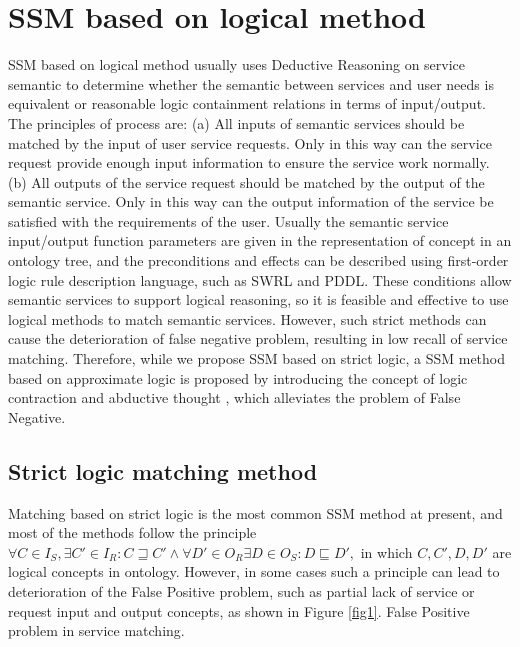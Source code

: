 \documentclass{ieeeaccess}
\begin{document}
\section{SSM based on logical method}
SSM based on logical method usually uses Deductive Reasoning on service semantic to determine whether the semantic between services and user needs is equivalent or reasonable logic containment relations in terms of input/output. The principles of process are: (a) All inputs of semantic services should be matched by the input of user service requests. Only in this way can the service request provide enough input information to ensure the service work normally. (b) All outputs of the service request should be matched by the output of the semantic service. Only in this way can the output information of the service be satisfied with the requirements of the user. Usually the semantic service input/output function parameters are given in the representation of concept in an ontology tree, and the preconditions and effects can be described using first-order logic rule description language, such as SWRL and PDDL. These conditions allow semantic services to support logical reasoning, so it is feasible and effective to use logical methods to match semantic services. However, such strict methods can cause the deterioration of false negative problem, resulting in low recall of service matching. Therefore, while we propose SSM based on strict logic, a SSM method based on approximate logic is proposed by introducing the concept of logic contraction and abductive thought \cite{di2009tableaux}, which alleviates the problem of False Negative.

\subsection{Strict logic matching method}
\label{2.1}
Matching based on strict logic is the most common SSM method at present, and most of the methods follow the principle
$
\forall C \in I_{S}, \exists {C}'\in I_{R}:
C\sqsupseteq {C}'\wedge \forall {D}'\in O_{R}\exists D\in O_{S}:D\sqsubseteq {D}',
$
in which $C,C',D,D'$ are logical concepts in ontology. However, in some cases such a principle can lead to deterioration of the False Positive problem, such as partial lack of service or request input and output concepts, as shown in Figure \ref{fig1}.
{False Positive problem in service matching.
\label{fig1}}
\end{document}
